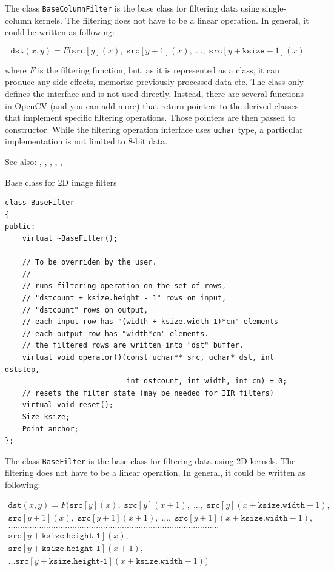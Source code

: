 The class \texttt{BaseColumnFilter} is the base class for filtering data using single-column kernels. The filtering does not have to be a linear operation. In general, it could be written as following:

\[\texttt{dst}(x,y) = F(\texttt{src}[y](x),\;\texttt{src}[y+1](x),\;...,\;\texttt{src}[y+\texttt{ksize}-1](x)\]

where $F$ is the filtering function, but, as it is represented as a class, it can produce any side effects, memorize previously processed data etc. The class only defines the interface and is not used directly. Instead, there are several functions in OpenCV (and you can add more) that return pointers to the derived classes that implement specific filtering operations. Those pointers are then passed to  constructor. While the filtering operation interface uses \texttt{uchar} type, a particular implementation is not limited to 8-bit data.

See also: , , ,
    , , 


\label{BaseFilter}
Base class for 2D image filters

\begin{lstlisting}
class BaseFilter
{
public:
    virtual ~BaseFilter();
    
    // To be overriden by the user.
    //
    // runs filtering operation on the set of rows,
    // "dstcount + ksize.height - 1" rows on input,
    // "dstcount" rows on output,
    // each input row has "(width + ksize.width-1)*cn" elements
    // each output row has "width*cn" elements.
    // the filtered rows are written into "dst" buffer.
    virtual void operator()(const uchar** src, uchar* dst, int dststep,
                            int dstcount, int width, int cn) = 0;
    // resets the filter state (may be needed for IIR filters)                        
    virtual void reset();
    Size ksize;
    Point anchor;
};
\end{lstlisting}

The class \texttt{BaseFilter} is the base class for filtering data using 2D kernels. The filtering does not have to be a linear operation. In general, it could be written as following:

\[
  \begin{array}{l}
  \texttt{dst}(x,y) = F( \texttt{src}[y](x),\;\texttt{src}[y](x+1),\;...,\;\texttt{src}[y](x+\texttt{ksize.width}-1), \\
  \texttt{src}[y+1](x),\;\texttt{src}[y+1](x+1),\;...,\;\texttt{src}[y+1](x+\texttt{ksize.width}-1), \\
  ......................................................................................... \\
  \texttt{src}[y+\texttt{ksize.height-1}](x),\\
  \texttt{src}[y+\texttt{ksize.height-1}](x+1),\\
  ...
  \texttt{src}[y+\texttt{ksize.height-1}](x+\texttt{ksize.width}-1))
  \end{array}
  \]

